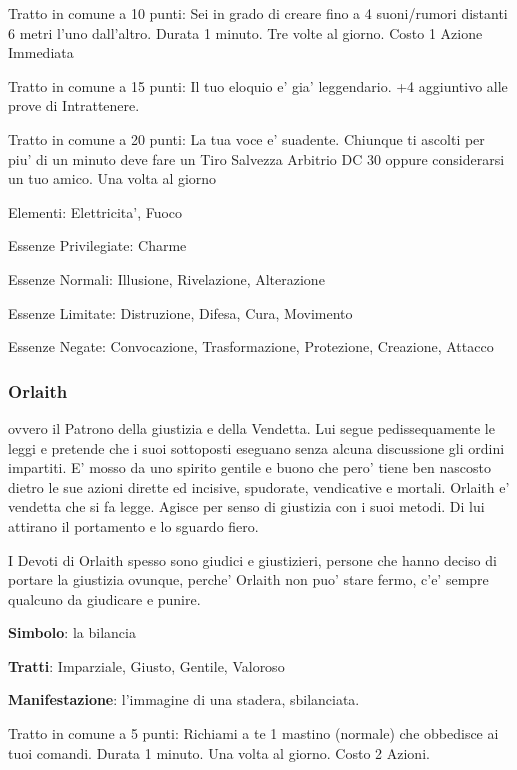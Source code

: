 \documentclass[a4paper,11pt,twoside,openany]{book}
\begin{document}
{		Tratto in comune a 10 punti: Sei in grado di creare fino a 4 suoni/rumori distanti 6 metri l'uno dall'altro. Durata 1 minuto. Tre volte al giorno. Costo 1 Azione Immediata
		
		Tratto in comune a 15 punti: Il tuo eloquio e' gia' leggendario. +4 aggiuntivo alle prove di Intrattenere.
		
		Tratto in comune a 20 punti: La tua voce e' suadente. Chiunque ti ascolti per piu' di un minuto deve fare un Tiro Salvezza Arbitrio DC 30 oppure considerarsi un tuo amico. Una volta al giorno
		
		\bigskip
		
		Elementi: Elettricita', Fuoco
		
		\bigskip
		
		Essenze Privilegiate: Charme
		
		Essenze Normali: Illusione, Rivelazione, Alterazione
		
		Essenze Limitate: Distruzione, Difesa, Cura, Movimento
		
		Essenze Negate: Convocazione, Trasformazione, Protezione, Creazione, Attacco
		
		\subsubsection{Orlaith}
		
		\label{orlaith}
		
		ovvero il Patrono della giustizia e della Vendetta. Lui segue pedissequamente le leggi e pretende che i suoi sottoposti eseguano senza alcuna discussione gli ordini impartiti. E' mosso da uno spirito gentile e buono che pero' tiene ben nascosto dietro le sue azioni dirette ed incisive, spudorate, vendicative e mortali. Orlaith e' vendetta che si fa legge. Agisce per senso di giustizia con i suoi metodi. Di lui attirano il portamento e lo sguardo fiero.
		
		I Devoti di Orlaith spesso sono giudici e giustizieri, persone che hanno deciso di portare la giustizia ovunque, perche' Orlaith non puo' stare fermo, c'e' sempre qualcuno da giudicare e punire.
		
		\textbf{Simbolo}: la bilancia
		
		\textbf{Tratti}: Imparziale, Giusto, Gentile, Valoroso
		
		\textbf{Manifestazione}: l'immagine di una stadera, sbilanciata.
		
		\bigskip
		
		Tratto in comune a 5 punti: Richiami a te 1 mastino (normale) che obbedisce ai tuoi comandi. Durata 1 minuto. Una volta al giorno. Costo 2 Azioni.
		
}
\end{document}
